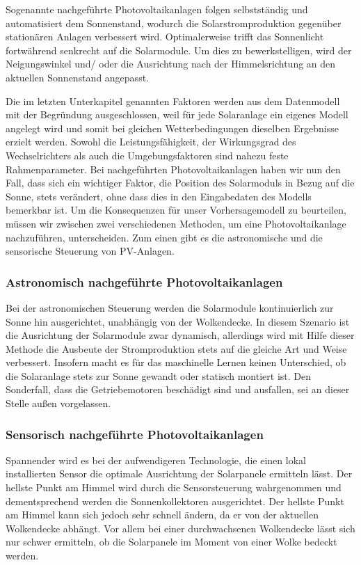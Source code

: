 \documentclass[12pt, a4paper]{article}
\begin{document}
Sogenannte nachgeführte Photovoltaikanlagen folgen selbstständig und automatisiert dem Sonnenstand, wodurch die Solarstromproduktion gegenüber stationären Anlagen verbessert wird. Optimalerweise trifft das Sonnenlicht fortwährend senkrecht auf die Solarmodule. Um dies zu bewerkstelligen, wird der Neigungswinkel und/ oder die Ausrichtung nach der Himmelsrichtung an den aktuellen Sonnenstand angepasst. 

Die im letzten Unterkapitel genannten Faktoren werden aus dem Datenmodell mit der Begründung ausgeschlossen, weil für jede Solaranlage ein eigenes Modell angelegt wird und somit bei gleichen Wetterbedingungen dieselben Ergebnisse erzielt werden. 
Sowohl die Leistungsfähigkeit, der Wirkungsgrad des Wechselrichters als auch die Umgebungsfaktoren sind nahezu feste Rahmenparameter. Bei nachgeführten Photovoltaikanlagen haben wir nun den Fall, dass sich ein wichtiger Faktor, die Position des Solarmoduls in Bezug auf die Sonne, stets verändert, ohne dass dies in den Eingabedaten des Modells bemerkbar ist. Um die Konsequenzen für unser Vorhersagemodell zu beurteilen, müssen wir zwischen zwei verschiedenen Methoden, um eine Photovoltaikanlage nachzuführen, unterscheiden. Zum einen gibt es die astronomische und die sensorische Steuerung von PV-Anlagen. 

\subsubsection{Astronomisch nachgeführte Photovoltaikanlagen}

Bei der astronomischen Steuerung werden die Solarmodule kontinuierlich zur Sonne hin ausgerichtet, unabhängig von der Wolkendecke. In diesem Szenario ist die Ausrichtung der Solarmodule zwar dynamisch, allerdings wird mit Hilfe dieser Methode die Ausbeute der Stromproduktion stets auf die gleiche Art und Weise verbessert. Insofern macht es für das maschinelle Lernen keinen Unterschied, ob die Solaranlage stets zur Sonne gewandt oder statisch montiert ist. Den Sonderfall, dass die Getriebemotoren beschädigt sind und ausfallen, sei an dieser Stelle außen vorgelassen.

\subsubsection{Sensorisch nachgeführte Photovoltaikanlagen}

Spannender wird es bei der aufwendigeren Technologie, die einen lokal installierten Sensor die optimale Ausrichtung der Solarpanele ermitteln lässt. Der hellste Punkt am Himmel wird durch die Sensorsteuerung wahrgenommen und dementsprechend werden die Sonnenkollektoren ausgerichtet. Der hellste Punkt am Himmel kann sich jedoch sehr schnell ändern, da er von der aktuellen Wolkendecke abhängt. Vor allem bei einer durchwachsenen Wolkendecke lässt sich nur schwer ermitteln, ob die Solarpanele im Moment von einer Wolke bedeckt werden. 
\end{document}
